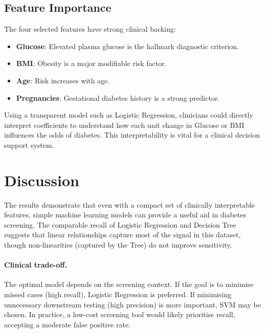 \documentclass[12pt,a4paper]{article}
\begin{document}
\subsection{Feature Importance}
\label{subsec:features}

The four selected features have strong clinical backing:
\begin{itemize}
    \item \textbf{Glucose}: Elevated plasma glucose is the hallmark diagnostic criterion.
    \item \textbf{BMI}: Obesity is a major modifiable risk factor.
    \item \textbf{Age}: Risk increases with age.
    \item \textbf{Pregnancies}: Gestational diabetes history is a strong predictor.
\end{itemize}

Using a transparent model such as Logistic Regression, clinicians could directly interpret coefficients to understand how each unit change in Glucose or BMI influences the odds of diabetes. This interpretability is vital for a clinical decision support system.

\section{Discussion}
\label{sec:discussion}

The results demonstrate that even with a compact set of clinically interpretable features, simple machine learning models can provide a useful aid in diabetes screening. The comparable recall of Logistic Regression and Decision Tree suggests that linear relationships capture most of the signal in this dataset, though non-linearities (captured by the Tree) do not improve sensitivity.

\paragraph{Clinical trade-off.} The optimal model depends on the screening context. If the goal is to minimise missed cases (high recall), Logistic Regression is preferred. If minimising unnecessary downstream testing (high precision) is more important, SVM may be chosen. In practice, a low-cost screening tool would likely prioritise recall, accepting a moderate false positive rate.
\end{document}
